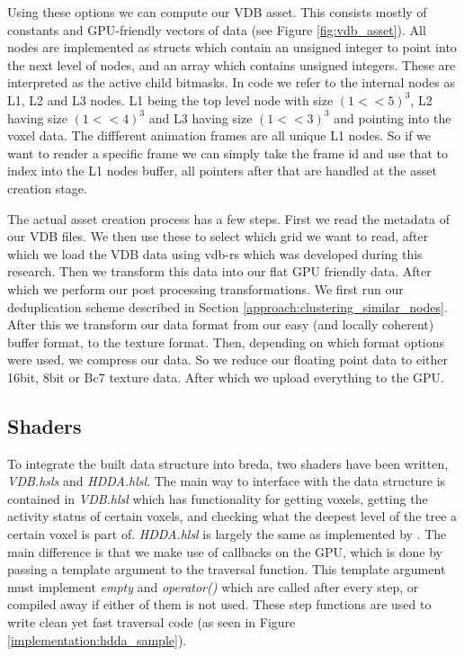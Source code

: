 Using these options we can compute our VDB asset. This consists mostly of constants and GPU-friendly vectors of data (see Figure \ref{fig:vdb_asset}). All nodes are implemented as structs which contain an unsigned integer to point into the next level of nodes, and an array which contains unsigned integers. These are interpreted as the active child bitmasks. In code we refer to the internal nodes as L1, L2 and L3 nodes. L1 being the top level node with size $(1 << 5)^3$, L2 having size $(1 << 4)^3$ and L3 having size $(1 << 3)^3$ and pointing into the voxel data. The diffferent animation frames are all unique L1 nodes. So if we want to render a specific frame we can simply take the frame id and use that to index into the L1 nodes buffer, all pointers after that are handled at the asset creation stage.

The actual asset creation process has a few steps. First we read the metadata of our VDB files. We then use these to select which grid we want to read, after which we load the VDB data using vdb-rs \cite{VDBRS} which was developed during this research. Then we transform this data into our flat GPU friendly data. After which we perform our post processing transformations. We first run our deduplication scheme described in Section \ref{approach:clustering_similar_nodes}. After this we transform our data format from our easy (and locally coherent) buffer format, to the texture format. Then, depending on which format options were used, we compress our data. So we reduce our floating point data to either 16bit, 8bit or Bc7 texture data. After which we upload everything to the GPU.


\subsection{Shaders} \label{implementation:shaders}
To integrate the built data structure into breda, two shaders have been written, \textit{VDB.hsls} and \textit{HDDA.hlsl}. The main way to interface with the data structure is contained in \textit{VDB.hlsl} which has functionality for getting voxels, getting the activity status of certain voxels, and checking what the deepest level of the tree a certain voxel is part of. \textit{HDDA.hlsl} is largely the same as implemented by \cite{museth2013vdb}. The main difference is that we make use of callbacks on the GPU, which is done by passing a template argument to the traversal function. This template argument must implement \textit{empty} and \textit{operator()} which are called after every step, or compiled away if either of them is not used. These step functions are used to write clean yet fast traversal code (as seen in Figure \ref{implementation:hdda_sample}).


